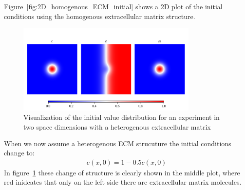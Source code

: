 Figure~\ref{fig:2D_homogenous_ECM_initial} shows a 2D plot of the initial conditions using the homogenous extracellular matrix structure.\newline 
\begin{figure}[h]
    \centering
    \label{fig:Initial_Value_Distribution}
    \includegraphics[width=0.8\textwidth]{resources/images/2D_initial_conditions_heterogenous_ECM.png}
    \caption{Visualization of the initial value distribution for an experiment in two space dimensions with a heterogenous extracellular matrix}
    \label{fig:2D_heterogenous_ECM_initial}
\end{figure}
When we now assume a heterogenous ECM strucuture the initial conditions change to:
\begin{align*}
    e(x,0) = 1 - 0.5 c(x,0)
\end{align*}
In figure~\ref{fig:2D_heterogenous_ECM_initial} these change of structure is clearly shown in the middle plot, where red inidcates that only on the left side there are extracellular matrix molecules.